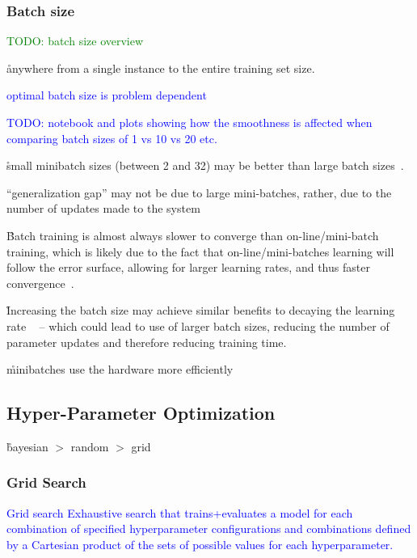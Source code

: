 \subsubsection{Batch size}

\textcolor{green}{TODO: batch size overview}

\r{anywhere from a single instance to the entire training set size.}

\textcolor{blue}{optimal batch size is problem dependent}

\textcolor{blue}{TODO: notebook and plots showing how the smoothness is affected when comparing batch sizes of 1 vs 10 vs 20 etc.}


\r{small minibatch sizes (between 2 and 32) may be better than large batch sizes~\cite{masters2018revisiting}.}

\r{``generalization gap'' may not be due to large mini-batches, rather, due to the number of updates made to the system~\cite{hoffer2017train}}

\r{Batch training is almost always slower to converge than on-line/mini-batch training, which is likely due to the fact that on-line/mini-batches learning will follow the error surface, allowing for larger learning rates, and thus faster convergence~\cite{wilson2003general}.}

\r{Increasing the batch size may achieve similar benefits to decaying the learning rate ~\cite{smith2017don} -- which could lead to use of larger batch sizes, reducing the number of parameter updates and therefore reducing training time.}

\r{minibatches use the hardware more efficiently}


\subsection{Hyper-Parameter Optimization}

\r{bayesian $>$ random $>$ grid}

\subsubsection{Grid Search}

\textcolor{blue}{{Grid search} Exhaustive search that trains+evaluates a model for each combination of specified hyperparameter configurations and combinations defined by a Cartesian product of the sets of possible values for each hyperparameter.}

